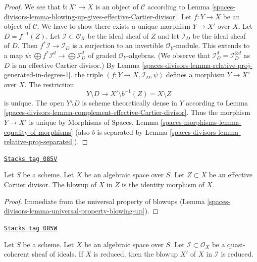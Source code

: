 \begin{proof}
We see that $b : X' \to X$ is an object of $\mathcal{C}$ according to
Lemma \ref{spaces-divisors-lemma-blowing-up-gives-effective-Cartier-divisor}.
Let $f : Y \to X$ be an object of $\mathcal{C}$. We have to show there exists
a unique morphism $Y \to X'$ over $X$. Let $D = f^{-1}(Z)$.
Let $\mathcal{I} \subset \mathcal{O}_X$ be the ideal sheaf of $Z$
and let $\mathcal{I}_D$ be the ideal sheaf of $D$. Then
$f^*\mathcal{I} \to \mathcal{I}_D$ is a surjection
to an invertible $\mathcal{O}_Y$-module. This extends to a map
$\psi : \bigoplus f^*\mathcal{I}^d \to \bigoplus \mathcal{I}_D^d$
of graded $\mathcal{O}_Y$-algebras. (We observe that
$\mathcal{I}_D^d = \mathcal{I}_D^{\otimes d}$ as $D$ is an
effective Cartier divisor.) By
Lemma \ref{spaces-divisors-lemma-relative-proj-generated-in-degree-1}.
the triple $(f : Y \to X, \mathcal{I}_D, \psi)$ defines a
morphism $Y \to X'$ over $X$. The restriction
$$
Y \setminus D \longrightarrow X' \setminus b^{-1}(Z) = X \setminus Z
$$
is unique. The open $Y \setminus D$ is scheme theoretically dense in $Y$
according to Lemma \ref{spaces-divisors-lemma-complement-effective-Cartier-divisor}.
Thus the morphism $Y \to X'$ is unique by
Morphisms of Spaces, Lemma \ref{spaces-morphisms-lemma-equality-of-morphisms}
(also $b$ is separated by Lemma
\ref{spaces-divisors-lemma-relative-proj-separated}).
\end{proof}

\begin{lemma}
\label{spaces-divisors-lemma-blow-up-effective-Cartier-divisor}
\href{https://stacks.math.columbia.edu/tag/085V}{\texttt{Stacks tag 085V}}

Let $S$ be a scheme. Let $X$ be an algebraic space over $S$.
Let $Z \subset X$ be an effective Cartier divisor.
The blowup of $X$ in $Z$ is the identity morphism of $X$.
\end{lemma}

\begin{proof}
Immediate from the universal property of blowups
(Lemma \ref{spaces-divisors-lemma-universal-property-blowing-up}).
\end{proof}

\begin{lemma}
\label{spaces-divisors-lemma-blow-up-reduced-space}
\href{https://stacks.math.columbia.edu/tag/085W}{\texttt{Stacks tag 085W}}

Let $S$ be a scheme. Let $X$ be an algebraic space over $S$.
Let $\mathcal{I} \subset \mathcal{O}_X$ be a
quasi-coherent sheaf of ideals. If $X$ is reduced, then the
blowup $X'$ of $X$ in $\mathcal{I}$ is reduced.
\end{lemma}

